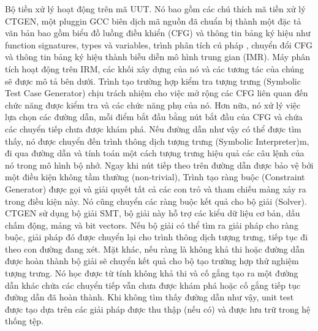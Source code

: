 \documentclass[12pt,a4paper]{article}
\begin{document}
\indent Bộ tiền xử lý hoạt động trên mã UUT. Nó bao gồm các chú thích mã tiền xử lý CTGEN, một pluggin GCC biên dịch mã nguồn đã chuẩn bị thành một đặc tả văn bản bao gồm biểu đồ luồng điều khiển (CFG) và thông tin bảng ký hiệu như function signatures, types và variables, trình phân tích cú pháp , chuyển đổi CFG và thông tin bảng ký hiệu thành biễu diễn mô hình trung gian (IMR).\newline
\indent Máy phân tích hoạt động trên IRM, các khối xây dựng của nó và các tương tác của chúng sẽ được mô tả bên dưới. Trình tạo trường hợp kiểm tra tượng trưng (Symbolic Test Case Generator) chịu trách nhiệm cho việc mở rộng các CFG liên quan đến chức năng được kiểm tra và các chức năng phụ của nó. Hơn nữa, nó xử lý việc lựa chọn các đường dẫn, mỗi điểm bắt đầu bằng nút bắt đầu của CFG và chứa các chuyển tiếp chưa được khám phá. Nếu đường dẫn như vậy có thể được tìm thấy, nó được chuyển đến trình thông dịch tượng trưng (Symbolic Interpreter)m, đi qua đường dẫn và tính toán một cách tượng trưng hiệu quả các câu lệnh của nó trong mô hình bộ nhớ. Ngay khi nút tiếp theo trên đường dẫn được bảo vệ bởi một điều kiện không tầm thường (non-trivial), Trình tạo ràng buộc (Constraint Generator) được gọi và giải quyết tất cả các con trỏ và tham chiếu mảng xảy ra trong điều kiện này. Nó cũng chuyển các ràng buộc kết quả cho bộ giải (Solver). CTGEN sử dụng bộ giải SMT, bộ giải này hỗ trợ các kiểu dữ liệu cơ bản, dấu chấm động, mảng và bit vectors. Nếu bộ giải có thể tìm ra giải pháp cho ràng buộc, giải pháp đó được chuyển lại cho trình thông dịch tượng trưng, tiếp tục đi theo con đường đang xét. Mặt khác, nếu ràng là không khả thi hoặc đường dẫn được hoàn thành bộ giải sẽ chuyển kết quả cho bộ tạo trường hợp thử nghiệm tượng trưng. Nó học được từ tính không khả thi và cố gắng tạo ra một đường dẫn khác chứa các chuyển tiếp vẫn chưa được khám phá hoặc cố gắng tiếp tục đường dẫn đã hoàn thành. Khi không tìm thấy đường dẫn như vậy, unit test được tạo dựa trên các giải pháp được thu thập (nếu có) và được lưu trữ trong hệ thống tệp. 
\end{document}
